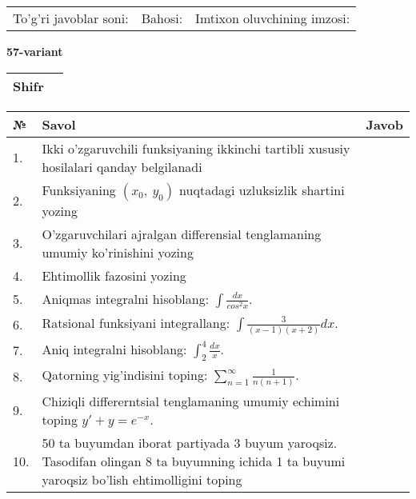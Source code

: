 \documentclass{article}
\begin{document}
  \vspace{1cm}
  
  \begin{tabular}{lll}
  To'g'ri javoblar soni: \underline{\hspace{1.5cm}} & 
  Bahosi: \underline{\hspace{1.5cm}} & 
  Imtixon oluvchining imzosi: \underline{\hspace{2cm}} \\
  \end{tabular}
  
  \egroup
  
  \newpage
  
  
  \textbf{57-variant}\\
  
  \bgroup
  \def\arraystretch{1.6} %
  
  \begin{tabular}{|m{5.7cm}|m{9.5cm}|}
  \hline
  Shifr & \\
  \hline
  \end{tabular}
  
  \vspace{1cm}
  
  \begin{tabular}{|m{0.7cm}|m{10cm}|m{4cm}|}
  \hline
  № & Savol & Javob \\
  \hline
  1. & Ikki o'zgaruvchili funksiyaning ikkinchi tartibli xususiy hosilalari qanday belgilanadi &  \\
  \hline
  2. & Funksiyaning \((x_{0},\ y_{0})\) nuqtadagi uzluksizlik shartini yozing &  \\
  \hline
  3. & O'zgaruvchilari ajralgan differensial tenglamaning umumiy ko'rinishini yozing &  \\
  \hline
  4. & Ehtimollik fazosini yozing &  \\
  \hline
  5. & Aniqmas integralni hisoblang: \(\int \frac{dx}{cos^{2}x}\). &  \\
  \hline
  6. & Ratsional funksiyani integrallang: \(\int {\frac{3}{(x - 1)(x + 2)}dx}\). &  \\
  \hline
  7. & Aniq integralni hisoblang: \(\int_{2}^{4}\frac{dx}{x}\). &  \\
  \hline
  8. & Qatorning yig'indisini toping: \(\sum_{n = 1}^{\infty}\frac{1}{n(n + 1)}\). &  \\
  \hline
  9. & Chiziqli differerntsial tenglamaning umumiy echimini toping \(y' + y = e^{- x}\). &  \\
  \hline
  10. & 50 ta buyumdan iborat partiyada 3 buyum yaroqsiz. Tasodifan olingan 8 ta buyumning ichida 1 ta buyumi yaroqsiz bo'lish ehtimolligini toping &  \\
  \hline
  \end{tabular}
  
\end{document}
